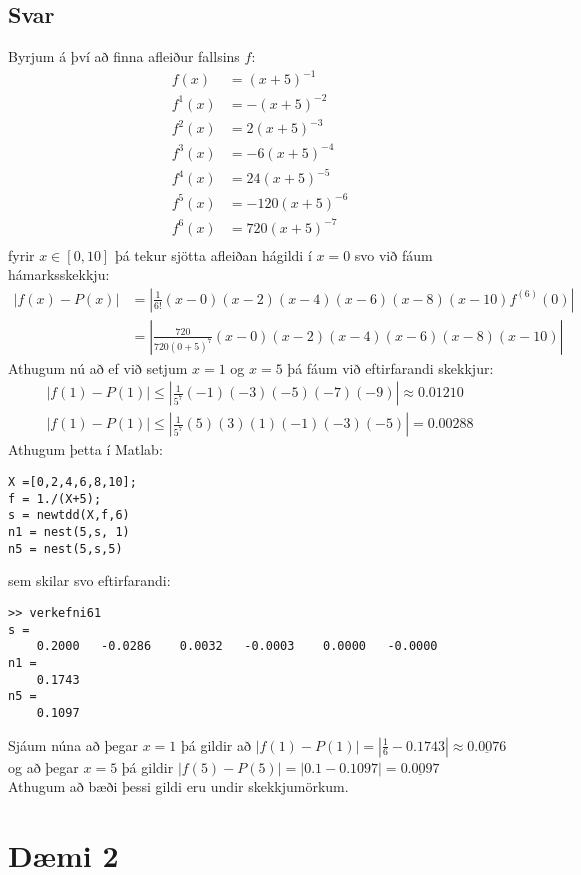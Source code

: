 \documentclass[11pt]{article}
\begin{document}
\subsection*{Svar}
Byrjum á því að finna afleiður fallsins $f$:
\begin{align*}
f(x)	&= (x+5)^{-1}\\
f^{1}(x)	&= -(x+5)^{-2}\\
f^{2}(x)	&= 2(x+5)^{-3}\\
f^{3}(x)	&= -6(x+5)^{-4}\\
f^{4}(x)	&= 24(x+5)^{-5}\\
f^{5}(x)	&= -120(x+5)^{-6}\\
f^{6}(x)	&= 720(x+5)^{-7}\\
\end{align*}
fyrir $x\in[0,10]$ þá tekur sjötta afleiðan hágildi í $x=0$ svo við fáum hámarksskekkju:
\begin{align*}
|f(x)-P(x)|	&= \left|\frac{1}{6!}(x-0)(x-2)(x-4)(x-6)(x-8)(x-10)f^{(6)}(0) \right|\\
			&= \left|\frac{720}{720(0+5)^7}(x-0)(x-2)(x-4)(x-6)(x-8)(x-10) \right|
\end{align*}
Athugum nú að ef við setjum $x=1$ og $x=5$ þá fáum við eftirfarandi skekkjur:
\begin{align*}
|f(1)-P(1)| \leq \left|\frac{1}{5^7}(-1)(-3)(-5)(-7)(-9) \right| \approx 0.01210\\
|f(1)-P(1)| \leq \left|\frac{1}{5^7}(5)(3)(1)(-1)(-3)(-5)\right| = 0.00288
\end{align*}
Athugum þetta í Matlab:
\begin{verbatim}
X =[0,2,4,6,8,10];
f = 1./(X+5);
s = newtdd(X,f,6)
n1 = nest(5,s, 1)
n5 = nest(5,s,5)
\end{verbatim}
sem skilar svo eftirfarandi:
\begin{verbatim}
>> verkefni61
s =
    0.2000   -0.0286    0.0032   -0.0003    0.0000   -0.0000
n1 =
    0.1743
n5 =
    0.1097
\end{verbatim}
Sjáum núna að þegar $x=1$ þá gildir að $|f(1)-P(1)| = |\frac 16 - 0.1743| \approx \underline{0.0076} $ og að þegar $x=5$ þá gildir $|f(5)-P(5)| = |0.1-0.1097| = \underline{0.0097}$\\
Athugum að bæði þessi gildi eru undir skekkjumörkum.




\section*{Dæmi 2}
\end{document}
